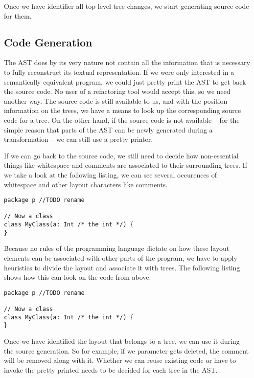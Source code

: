 \documentclass[10pt,a4paper,oneside]{scrreprt}
\begin{document}
Once we have identifier all top level tree changes, we start generating source code for them. 

\subsection{Code Generation}

The AST does by its very nature not contain all the information that is necessary to fully reconstruct its textual representation. If we were only interested in a semantically equivalent program, we could just pretty print the AST to get back the source code. No user of a refactoring tool would accept this, so we need another way. The source code is still available to us, and with the position information on the trees, we have a means to look up the corresponding source code for a tree. On the other hand, if the source code is not available -- for the simple reason that parts of the AST can be newly generated during a transformation -- we can still use a pretty printer.

If we can go back to the source code, we still need to decide how non-essential things like whitespace and comments are associated to their surrounding trees. If we take a look at the following listing, we can see several occurences of whitespace and other layout characters like comments. 

\begin{lstlisting}
package p //TODO rename

// Now a class
class MyClass(a: Int /* the int */) {
}
\end{lstlisting}

Because no rules of the programming language dictate on how these layout elements can be associated with other parts of the program, we have to apply heuristics to divide the layout and associate it with trees. The following listing shows how this can look on the code from above.

\begin{lstlisting}
package p //TODO rename

// Now a class
class MyClass(a: Int /* the int */) {
}
\end{lstlisting}

Once we have identified the layout that belongs to a tree, we can use it during the source generation. So for example, if we parameter gets deleted, the comment will be removed along with it. Whether we can reuse existing code or have to invoke the pretty printed needs to be decided for each tree in the AST. 
\end{document}
